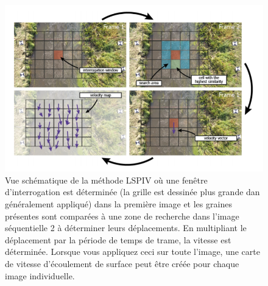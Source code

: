 \documentclass[
]{article}
\begin{document}
\begin{figure}
\includegraphics[width=1\linewidth]{images/pivprocessing} \caption{Vue schématique de la méthode LSPIV où une fenêtre d'interrogation est déterminée (la grille est dessinée plus grande dan généralement appliqué) dans la première image et les graines présentes sont comparées à une zone de recherche dans l'image séquentielle 2 à déterminer leurs déplacements. En multipliant le déplacement par la période de temps de trame, la vitesse est déterminée. Lorsque vous appliquez ceci sur toute l'image, une carte de vitesse d'écoulement de surface peut être créée pour chaque image individuelle.}\label{fig:pivprocessing}
\end{figure}

\newpage

  
\end{document}
